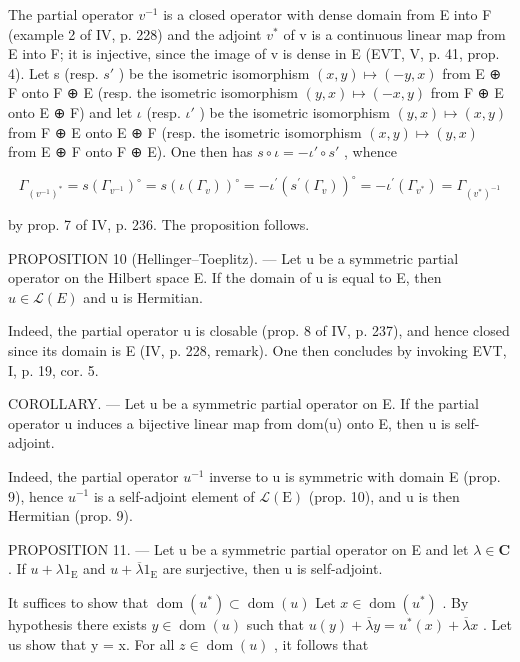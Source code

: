 The partial operator \(v^{-1}\) is a closed operator with dense domain from E into F (example 2 of IV, p. 228) and the adjoint \(v^{*}\) of v is a continuous linear map from E into F; it is injective, since the image of v is dense in E (EVT, V, p. 41, prop. 4). Let s (resp. \(s'\) ) be the isometric isomorphism \((x,y)\mapsto(-y,x)\) from E ⊕ F onto F ⊕ E (resp. the isometric isomorphism \((y,x)\mapsto(-x,y)\) from F ⊕ E onto E ⊕ F) and let \(\iota\) (resp. \(\iota'\) ) be the isometric isomorphism \((y,x)\mapsto(x,y)\) from F ⊕ E onto E ⊕ F (resp. the isometric isomorphism \((x,y)\mapsto(y,x)\) from E ⊕ F onto F ⊕ E). One then has \(s\circ\iota=-\iota'\circ s'\) , whence

\[
\Gamma_ {(v ^ {- 1}) ^ {*}} = s \left(\Gamma_ {v ^ {- 1}}\right) ^ {\circ} = s \left(\iota \left(\Gamma_ {v}\right)\right) ^ {\circ} = - \iota^ {\prime} \left(s ^ {\prime} \left(\Gamma_ {v}\right)\right) ^ {\circ} = - \iota^ {\prime} \left(\Gamma_ {v ^ {*}}\right) = \Gamma_ {(v ^ {*}) ^ {- 1}}
\]

by prop. 7 of IV, p. 236. The proposition follows.

PROPOSITION 10 (Hellinger--Toeplitz). --- Let u be a symmetric partial operator on the Hilbert space E. If the domain of u is equal to E, then \(u \in \mathcal{L}(E)\) and u is Hermitian.

Indeed, the partial operator u is closable (prop. 8 of IV, p. 237), and hence closed since its domain is E (IV, p. 228, remark). One then concludes by invoking EVT, I, p. 19, cor. 5.

COROLLARY. --- Let u be a symmetric partial operator on E. If the partial operator u induces a bijective linear map from dom(u) onto E, then u is self-adjoint.

Indeed, the partial operator \(u^{-1}\) inverse to u is symmetric with domain E (prop. 9), hence \(u^{-1}\) is a self-adjoint element of \(\mathcal{L}(\mathrm{E})\) (prop. 10), and u is then Hermitian (prop. 9).

PROPOSITION 11. --- Let u be a symmetric partial operator on E and let \(\lambda \in \mathbf{C}\) . If \(u + \lambda 1_{\mathrm{E}}\) and \(u + \overline{\lambda} 1_{\mathrm{E}}\) are surjective, then u is self-adjoint.

It suffices to show that \(\operatorname{dom}(u^{*}) \subset \operatorname{dom}(u)\) Let \(x \in \operatorname{dom}(u^{*})\) . By hypothesis there exists \(y \in \operatorname{dom}(u)\) such that \(u(y) + \overline{\lambda}y = u^{*}(x) + \overline{\lambda}x\) . Let us show that y = x. For all \(z \in \operatorname{dom}(u)\) , it follows that

